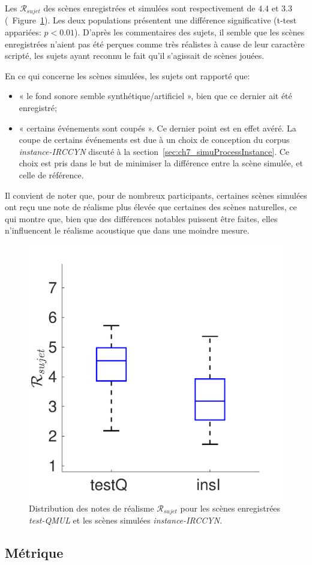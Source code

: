 Les $\mathcal{R}_{sujet}$ des scènes enregistrées et simulées sont respectivement de $4.4$ et $3.3$ (\cf~Figure~\ref{fig:xpRealism}). Les deux populations présentent une différence significative (t-test appariées: $p<0.01$). D'après les commentaires des sujets, il semble que les scènes enregistrées n'aient pas été perçues comme très réalistes à cause de leur caractère scripté, les sujets ayant reconnu le fait qu'il s'agissait de scènes jouées. 

En ce qui concerne les scènes simulées, les sujets ont rapporté que: 

\begin{itemize}
\item « le fond sonore semble synthétique/artificiel », bien que ce dernier ait été enregistré;
\item « certains événements sont coupés ». Ce dernier point est en effet avéré. La coupe de certains événements est due à un choix de conception du corpus \emph{instance-IRCCYN} discuté à la section~\ref{sec:ch7_simuProcessInstance}. Ce choix est pris dans le but de minimiser la différence entre la scène simulée, et celle de référence. 
\end{itemize}

Il convient de noter que, pour de nombreux participants, certaines scènes simulées ont reçu une note de réalisme plus élevée que certaines des scènes naturelles, ce qui montre que, bien que des différences notables puissent être faites, elles n'influencent le réalisme acoustique que dans une moindre mesure.

\begin{figure}[t]
\begin{center}
\includegraphics[width=.33\textwidth]{gfx/ch_7/xp_realism_2}
\caption{Distribution des notes de réalisme $\mathcal{R}_{sujet}$ pour les scènes enregistrées \emph{test-QMUL} et les scènes simulées \emph{instance-IRCCYN}.}
\label{fig:xpRealism} 
\end{center}
\end{figure}

\subsection{Métrique}
\label{sec:ch7_dcase2013metrique}

